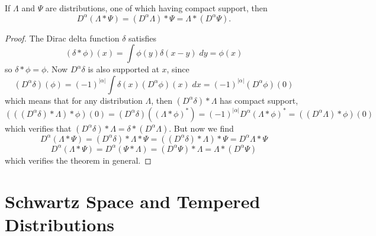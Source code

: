 \begin{theorem}
    If $\Lambda$ and $\Psi$ are distributions, one of which having compact support, then
    \[ D^\alpha(\Lambda * \Psi) = (D^\alpha \Lambda) * \Psi = \Lambda * (D^\alpha \Psi). \]
\end{theorem}
\begin{proof}
    The Dirac delta function $\delta$ satisfies
    \[ (\delta * \phi)(x) = \int \phi(y) \delta(x-y)\; dy = \phi(x) \]
    so $\delta * \phi = \phi$. Now $D^\alpha \delta$ is also supported at $x$, since
    \[ (D^\alpha \delta)(\phi) = (-1)^{|\alpha|} \int \delta(x) (D^\alpha \phi)(x)\; dx = (-1)^{|\alpha|} (D^\alpha \phi)(0) \]
    which means that for any distribution $\Lambda$, then $(D^\alpha \delta) * \Lambda$ has compact support,
    \[ (((D^\alpha \delta) * \Lambda) * \phi)(0) = (D^\alpha \delta)((\Lambda * \phi)^*) = (-1)^{|\alpha|} D^\alpha (\Lambda * \phi)^* = ((D^\alpha \Lambda) * \phi)(0) \]
    which verifies that $(D^\alpha \delta) * \Lambda = \delta * (D^\alpha \Lambda)$. But now we find
    \[ D^\alpha(\Lambda * \Psi) = (D^\alpha \delta) * \Lambda * \Psi = ((D^\alpha \delta) * \Lambda) * \Psi = D^\alpha \Lambda * \Psi \]
    \[ D^\alpha(\Lambda * \Psi) = D^\alpha(\Psi * \Lambda) = (D^\alpha \Psi) * \Lambda = \Lambda * (D^\alpha \Psi) \]
    which verifies the theorem in general.
\end{proof}

\section{Schwartz Space and Tempered Distributions}

